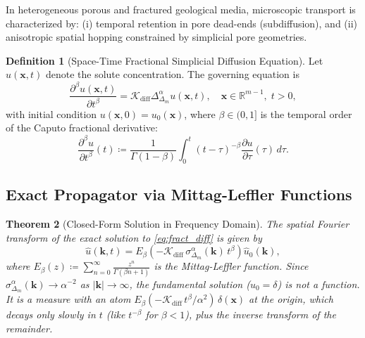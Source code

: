 \documentclass[11pt,a4paper]{article}
\theoremstyle{plain}
\newtheorem{theorem}{Theorem}[section]
\theoremstyle{definition}
\newtheorem{definition}[theorem]{Definition}
\theoremstyle{remark}
\numberwithin{equation}{section}
\begin{document}
In heterogeneous porous and fractured geological media, microscopic transport is characterized by: (i) temporal retention in pore dead-ends (subdiffusion), and (ii) anisotropic spatial hopping constrained by simplicial pore geometries.

\begin{definition}[Space-Time Fractional Simplicial Diffusion Equation]
Let $u(\mathbf{x}, t)$ denote the solute concentration. The governing equation is
\begin{equation}
\label{eq:fract_diff}
\frac{\partial^\beta u(\mathbf{x}, t)}{\partial t^\beta} = \mathcal{K}_{\text{diff}} \Delta_{\Delta_m}^\alpha u(\mathbf{x}, t), \quad \mathbf{x} \in \mathbb{R}^{m-1}, \; t > 0,
\end{equation}
with initial condition $u(\mathbf{x}, 0) = u_0(\mathbf{x})$, where $\beta \in (0, 1]$ is the temporal order of the Caputo fractional derivative:
\begin{equation}
\frac{\partial^\beta u}{\partial t^\beta}(t) \coloneqq \frac{1}{\Gamma(1-\beta)}\int_0^t (t-\tau)^{-\beta} \frac{\partial u}{\partial \tau}(\tau) \, d\tau.
\end{equation}
\end{definition}

\subsection{Exact Propagator via Mittag-Leffler Functions}

\begin{theorem}[Closed-Form Solution in Frequency Domain]
\label{thm:frequency_closed_form}
The spatial Fourier transform of the exact solution to \eqref{eq:fract_diff} is given by
\begin{equation}
\widehat{u}(\mathbf{k}, t) = E_\beta\left(-\mathcal{K}_{\text{diff}}\,\sigma_{\Delta_m}^\alpha(\mathbf{k})\,t^\beta\right) \widehat{u}_0(\mathbf{k}),
\end{equation}
where $E_\beta(z) \coloneqq \sum_{n=0}^\infty \frac{z^n}{\Gamma(\beta n + 1)}$ is the Mittag-Leffler function. Since $\sigma^\alpha_{\Delta_m}(\mathbf{k}) \to \alpha^{-2}$ as $|\mathbf{k}| \to \infty$, the fundamental solution ($u_0 = \delta$) is not a function. It is a measure with an atom $E_\beta(-\mathcal{K}_{\text{diff}}\,t^\beta/\alpha^2)\,\delta(\mathbf{x})$ at the origin, which decays only slowly in $t$ (like $t^{-\beta}$ for $\beta < 1$), plus the inverse transform of the remainder.
\end{theorem}
\end{document}
